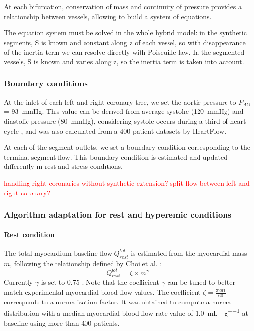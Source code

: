 \documentclass[journal]{IEEEtran}
\newcommand{\clcg}[1]{\textcolor{red}{#1}}
\begin{document}
At each bifurcation, conservation of mass and continuity of pressure provides a relationship between vessels, allowing to build a system of equations.

The equation system must be solved in the whole hybrid model:
in the synthetic segments, S is known and constant along z of each vessel, so with disappearance of the inertia term we can resolve directly with Poiseuille law. In the segmented vessels, S is  known and varies along z, so the inertia term is taken into account.  
\subsubsection{Boundary conditions}
At the inlet of each left and right coronary tree, we set the aortic pressure to $P_{AO}$ = \SI{93}{\mmHg}. This value can be derived from average systolic (\SI{120}{mmHg}) and diastolic pressure (\SI{80}{mmHg}), considering systole occurs during a third of heart cycle \cite{berne1967cardiovascular}, and was also calculated from a $400$ patient datasets by HeartFlow.

At each of the segment outlets, we set a boundary condition corresponding to the terminal segment flow.
This boundary condition is estimated and updated differently in rest and stress conditions.


\clcg{handling right coronaries without synthetic extension? split flow between left and right coronary?}



\subsubsection{Algorithm adaptation for rest and hyperemic conditions}

\paragraph{Rest condition}
The total myocardium baseline flow $Q_{rest}^{tot}$  is estimated from the myocardial mass $m$, following the relationship defined by Choi et al. \cite{choy2008scaling}:
\begin{equation}
Q_{rest}^{tot} = \zeta \times m^{\gamma}
\end{equation}
Currently $\gamma$ is set to $0.75$ \cite{choy2008scaling}. Note that the coefficient $\gamma$ can be tuned to better match experimental myocardial blood flow values. The coefficient $\zeta = \frac{3291}{60}$ corresponds to a normalization factor. It was obtained to compute a normal distribution with a median myocardial blood flow rate value of \SI{1.0}{\milli\liter\per\min\per\gram} at baseline using more than 400 patients.
\end{document}
